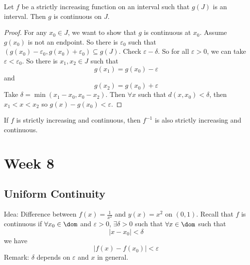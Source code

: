 \documentclass{report}
\begin{document}
\begin{theorem}{18.5}
    Let $f$ be a strictly increasing function on an interval such that $g(J)$ is an interval. Then $g$ is continuous on $J$.
\end{theorem}
    \begin{proof}
        For any $x_{0} \in J$, we want to show that $g$ is continuous at $x_{0}$. Assume $g(x_{0})$ is not an endpoint. So there is $\varepsilon_{0}$ such that $(g(x_{0}) - \varepsilon_{0}, g(x_{0}) + \varepsilon_{0}) \subseteq g(J)$. Check $\varepsilon -\delta$. So for all $\varepsilon > 0$, we can take $\varepsilon < \varepsilon_{0}$. So there is $x_{1}, x_{2} \in J$ such that 
            \begin{equation*}
                g(x_{1}) = g(x_{0}) - \varepsilon
            \end{equation*}
        and
            \begin{equation*}
                g(x_{2}) = g(x_{0}) + \varepsilon
            \end{equation*}
        Take $\delta = \min(x_{1} - x_{0}, x_{0} - x_{2})$. Then $\forall x$ such that $d(x, x_{0}) < \delta$, then $x_{1} < x < x_{2}$ so $g(x) - g(x_{0}) < \varepsilon$. 
    \end{proof}

\begin{theorem}{18.4}
    If $f$ is strictly increasing and continuous, then $f^{-1}$ is also strictly increasing and continuous.
\end{theorem}

\chapter{Week 8}

\begin{topic}
    \section{Uniform Continuity}
\end{topic}

Idea: Difference between $f(x) = \frac{1}{x^{2}}$ and $y(x) = x^{2}$ on $(0, 1)$. Recall that $f$ is continuous if $\forall x_{0} \in \dom$ and $\varepsilon> 0$, $\exists \delta> 0$ such that $\forall x \in \dom$ such that
    \begin{equation*}
        \lvert x - x_{0} \rvert < \delta
    \end{equation*}
we have
    \begin{equation*}
        \lvert f(x) - f(x_{0}) \rvert < \varepsilon
    \end{equation*}
Remark: $\delta$ depends on $\varepsilon$ and $x$ in general. 
\end{document}

